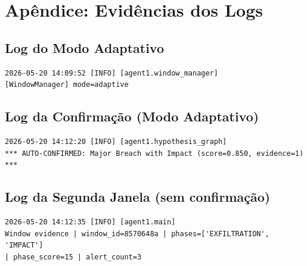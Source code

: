 \documentclass[10pt,a4paper]{article}
\begin{document}
\vspace{0.5cm}


\section*{Apêndice: Evidências dos Logs}

\subsection*{Log do Modo Adaptativo}
\begin{verbatim}
2026-05-20 14:09:52 [INFO] [agent1.window_manager] 
[WindowManager] mode=adaptive
\end{verbatim}

\subsection*{Log da Confirmação (Modo Adaptativo)}
\begin{verbatim}
2026-05-20 14:12:20 [INFO] [agent1.hypothesis_graph] 
*** AUTO-CONFIRMED: Major Breach with Impact (score=0.850, evidence=1) ***
\end{verbatim}

\subsection*{Log da Segunda Janela (sem confirmação)}
\begin{verbatim}
2026-05-20 14:12:35 [INFO] [agent1.main] 
Window evidence | window_id=8570648a | phases=['EXFILTRATION', 'IMPACT'] 
| phase_score=15 | alert_count=3
\end{verbatim}
\end{document}
